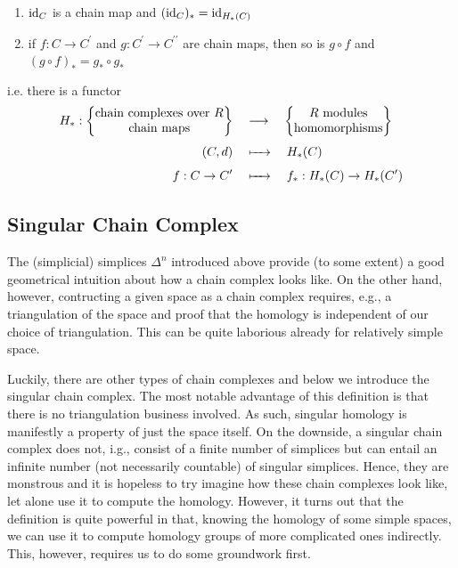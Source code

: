 \documentclass[a4paper,11pt]{article}
\begin{document}
			\begin{lemma}\phantom{j}
				\begin{enumerate}
					\item $\operatorname{id}_C$ is a chain map and $(\operatorname{id}_C)_\ast=\operatorname{id}_{H_\ast(C)}$
					\item if $f:C \rightarrow C ^{\prime}$ and $g:C ^{\prime}\rightarrow C^{\prime\prime}$ are chain maps, then so is $g\circ f$ and $(g \circ f)_\ast=g_\ast \circ g_\ast$	
				\end{enumerate}
				i.e. there is a functor 
				\begin{align*}
					H_\ast:\begin{Bmatrix}
						\text{\normalfont chain complexes over }R\\\text{\normalfont chain maps}
					\end{Bmatrix}
					\quad&\longrightarrow\quad
					\begin{Bmatrix}
						R\text{\normalfont\ modules}\\\text{\normalfont homomorphisms}
					\end{Bmatrix}\\
					(C,d)\quad&\xmapsto{\phantom{kkl}}\quad H_\ast(C)\\
					f:C \rightarrow C ^{\prime}\quad&\xmapsto{\phantom{kkl}}\quad f_\ast:H_\ast(C)\rightarrow H_\ast(C ^{\prime})
				\end{align*}
			\end{lemma}

		
		\subsection{Singular Chain Complex}

			The (simplicial) simplices $\Delta^n$ introduced above provide (to some extent) a good geometrical intuition about how a chain complex looks like. On the other hand, however, contructing a given space as a chain complex requires, e.g., a triangulation of the space and proof that the homology is independent of our choice of triangulation. This can be quite laborious already for relatively simple space.
			
			Luckily, there are other types of chain complexes and below we introduce the singular chain complex. The most notable advantage of this definition is that there is no triangulation business involved. As such, singular homology is manifestly a property of just the space itself. On the downside, a singular chain complex does not, i.g., consist of a finite number of simplices but can entail an infinite number (not necessarily countable) of singular simplices. Hence, they are monstrous and it is hopeless to try imagine how these chain complexes look like, let alone use it to compute the homology. However, it turns out that the definition is quite powerful in that, knowing the homology of some simple spaces, we can use it to compute homology groups of more complicated ones indirectly. This, however, requires us to do some groundwork first.
			
\end{document}
